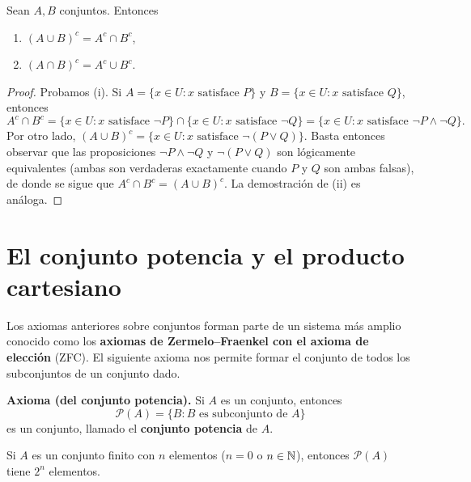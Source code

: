 \documentclass[12pt,a4paper]{book}
\begin{document}
    \begin{proposicion}
        Sean $A,B$ conjuntos. Entonces
        \begin{enumerate}[label=(\roman*)]
            \item $(A\cup B)^c = A^c \cap B^c$,
            \item $(A\cap B)^c = A^c \cup B^c$.
        \end{enumerate}
    \end{proposicion}

    \begin{proof}
        Probamos (i). Si $A=\{x\in U : x \text{ satisface } P\}$ y $B=\{x\in U : x \text{ satisface } Q\}$, entonces
        \begin{equation*}
            A^c\cap B^c = \{x\in U : x \text{ satisface } \neg P\} \cap \{x\in U: x \text{ satisface } \neg Q\} = \{x\in U : x \text{ satisface } \neg P \wedge \neg Q\}.
        \end{equation*}
        Por otro lado, $(A\cup B)^c = \{x\in U : x \text{ satisface } \neg(P\vee Q)\}$. Basta entonces observar que las proposiciones $\neg P \wedge \neg Q$ y $\neg(P\vee Q)$ son lógicamente equivalentes (ambas son verdaderas exactamente cuando $P$ y $Q$ son ambas falsas), de donde se sigue que $A^c\cap B^c = (A\cup B)^c$. La demostración de (ii) es análoga.
    \end{proof}

    \section{El conjunto potencia y el producto cartesiano}

    Los axiomas anteriores sobre conjuntos forman parte de un sistema más amplio conocido como los \textbf{axiomas de Zermelo--Fraenkel con el axioma de elección} (ZFC). El siguiente axioma nos permite formar el conjunto de todos los subconjuntos de un conjunto dado.

    \noindent\textbf{Axioma (del conjunto potencia).} Si $A$ es un conjunto, entonces
    \begin{equation*}
        \mathcal{P}(A) = \{B : B \text{ es subconjunto de } A\}
    \end{equation*}
    es un conjunto, llamado el \textbf{conjunto potencia} de $A$.

    \begin{proposicion}
        Si $A$ es un conjunto finito con $n$ elementos ($n=0$ o $n\in\mathbb{N}$), entonces $\mathcal{P}(A)$ tiene $2^n$ elementos.
    \end{proposicion}
\end{document}
